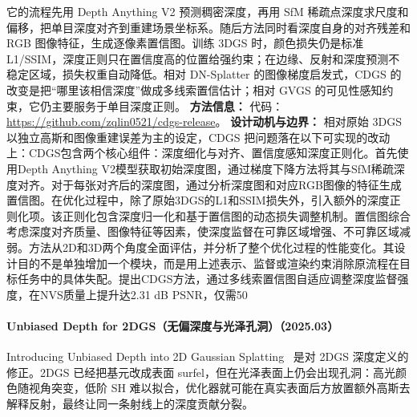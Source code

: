 它的流程先用 Depth Anything V2 预测稠密深度，再用 SfM 稀疏点深度求尺度和偏移，把单目深度对齐到重建场景坐标系。随后方法同时看深度自身的对齐残差和 RGB 图像特征，生成逐像素置信图。训练 3DGS 时，颜色损失仍是标准 L1/SSIM，深度正则只在置信度高的位置给强约束；在边缘、反射和深度预测不稳定区域，损失权重自动降低。相对 DN-Splatter 的图像梯度启发式，CDGS 的改变是把“哪里该相信深度”做成多线索置信估计；相对 GVGS 的可见性感知约束，它仍主要服务于单目深度正则。
\textbf{方法信息：} 代码：\url{https://github.com/zqlin0521/cdgs-release}。
\textbf{设计动机与边界：} 相对原始 3DGS 以独立高斯和图像重建误差为主的设定，CDGS 把问题落在以下可实现的改动上：CDGS包含两个核心组件：深度细化与对齐、置信度感知深度正则化。首先使用Depth Anything V2模型获取初始深度图，通过梯度下降方法将其与SfM稀疏深度对齐。对于每张对齐后的深度图，通过分析深度图和对应RGB图像的特征生成置信图。在优化过程中，除了原始3DGS的L1和SSIM损失外，引入额外的深度正则化项。该正则化包含深度归一化和基于置信图的动态损失调整机制。置信图综合考虑深度对齐质量、图像特征等因素，使深度监督在可靠区域增强、不可靠区域减弱。方法从2D和3D两个角度全面评估，并分析了整个优化过程的性能变化。其设计目的不是单独增加一个模块，而是用上述表示、监督或渲染约束消除原流程在目标任务中的具体失配。提出CDGS方法，通过多线索置信图自适应调整深度监督强度，在NVS质量上提升达2.31 dB PSNR，仅需50%
\paragraph{Unbiased Depth for 2DGS（无偏深度与光泽孔洞）（2025.03）}
Introducing Unbiased Depth into 2D Gaussian Splatting~\cite{2503_06587} 是对 2DGS 深度定义的修正。2DGS 已经把基元改成表面 surfel，但在光泽表面上仍会出现孔洞：高光颜色随视角突变，低阶 SH 难以拟合，优化器就可能在真实表面后方放置额外高斯去解释反射，最终让同一条射线上的深度贡献分裂。

